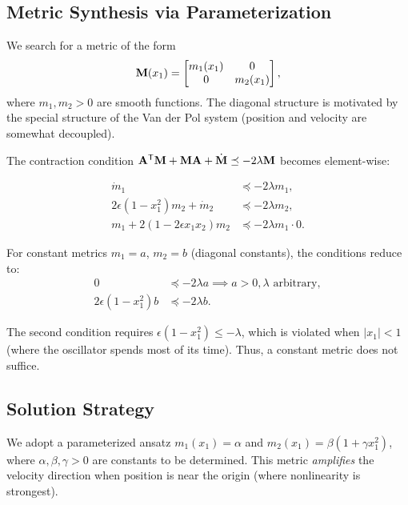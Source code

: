 \subsection{Metric Synthesis via Parameterization}

We search for a metric of the form
\begin{equation}
\mathbf{M}(x_1) = \begin{bmatrix} m_1(x_1) & 0 \\ 0 & m_2(x_1) \end{bmatrix},
\label{eq:ch4:vdp-metric-ansatz}
\end{equation}
where $m_1, m_2 > 0$ are smooth functions. The diagonal structure is motivated by the
special structure of the Van der Pol system (position and velocity are somewhat decoupled).

The contraction condition $\mathbf{A}^{\mathsf{T}}\mathbf{M} + \mathbf{M}\mathbf{A} + \dot{\mathbf{M}} \preceq -2\lambda\mathbf{M}$
becomes element-wise:

\begin{align}
\label{eq:ch4:vdp-cc-11}
\dot{m}_1 &\preceq -2\lambda m_1, \\
\label{eq:ch4:vdp-cc-22}
2\epsilon(1-x_1^2)m_2 + \dot{m}_2 &\preceq -2\lambda m_2, \\
\label{eq:ch4:vdp-cc-12}
m_1 + 2(1 - 2\epsilon x_1 x_2)m_2 &\preceq -2\lambda m_1 \cdot 0.
\end{align}

For constant metrics $m_1 = a$, $m_2 = b$ (diagonal constants), the conditions reduce to:
\begin{align}
0 &\preceq -2\lambda a \implies a > 0, \lambda \text{ arbitrary}, \\
2\epsilon(1-x_1^2)b &\preceq -2\lambda b.
\end{align}

The second condition requires $\epsilon(1-x_1^2) \leq -\lambda$, which is violated when
$|x_1| < 1$ (where the oscillator spends most of its time). Thus, a constant metric
does not suffice.

\subsection{Solution Strategy}

We adopt a parameterized ansatz $m_1(x_1) = \alpha$ and $m_2(x_1) = \beta(1 + \gamma x_1^2)$,
where $\alpha, \beta, \gamma > 0$ are constants to be determined. This metric \emph{amplifies}
the velocity direction when position is near the origin (where nonlinearity is strongest).

